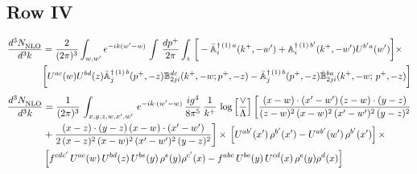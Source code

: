 \documentclass[9pt]{article}
\def\mf#1{\mathbb{#1}}
\numberwithin{equation}{section}
\begin{document}
\subsection{{\color{green}Row IV}}
\begin{align}
 \frac{d^{3}N_{\rm NLO}^{\rm}}{d^{3}k}  & = \frac{2}{(2\pi)^{3}}  \int_{w, w^\prime} e^{-ik(w^\prime-w)}\, \int\,\frac{dp^{+}}{2\pi} \int_{z}\,\bigg[-\bar{\mf{A}}^{\dagger\,(1)\,a}_{i}(k^{+},-w^{\prime})+\mf{A}^{\dagger\, (1)\, b^{\prime}}_{i}(k^{+},-w^{\prime})U^{b^{\prime}a}(w^{\prime})\bigg]\times \notag \\ & \bigg[U^{ac}(w)U^{bd}(z) \bar{\mf{A}}^{\dagger\, (1)\, b}_{j}(p^+,- z) {\mf{B}}^{dc}_{2ji} (k^+, -w;p^+, -z) - \Bar{\mf{A}}^{\dagger\, (1)\, b}_{j}(p^{+}, -z)\Bar{\mf{B}}^{ba}_{2ji}(k^{+},-w;\,p^{+}, -z) \bigg] \nonumber
\end{align}
\begin{align}
    \frac{d^{3}N_{\rm NLO}^{\rm}}{d^{3}k}  & =  \frac{1}{(2\pi)^{3}}\,
    \int_{x,y,z,w,x',w'}\,e^{-ik\cdot (w^\prime-w)}\, \frac{ig^{4}}{8\pi^{5}}\,\frac{1}{k^{+}}\,\log{\left[\frac{\vee}{\Lambda}\right]}\,\bigg[\frac{(x-w)\cdot (x'-w')\,(z-w)\cdot (y-z)}{(z-w)^{2}\,(x-w)^{2}\,(x'-w')^{2}\,(y-z)^{2}}\notag \\ & +\frac{(x-z)\cdot (y-z)\,(x-w)\cdot (x'-w')}{2\, (x-z)^{2}\,(x-w)^{2}\,(x'-w')^{2}\,(y-z)^{2}}\bigg]\times\,\left[U^{ab'}(x')\,\rho^{b'}(x')-U^{ab'}(w')\,\rho^{b'}(x')\right]\times\notag \\ &  \left[f^{cdc'}\,U^{ac}(w)\,U^{bd}(z)\,U^{be}(y)\,\rho^{e}(y)\rho^{c'}(x)-f^{abc}\,U^{be}(y)\,U^{cd}(x)\,\rho^{e}(y)\rho^{d}(x)\right]
\end{align}
\end{document}
